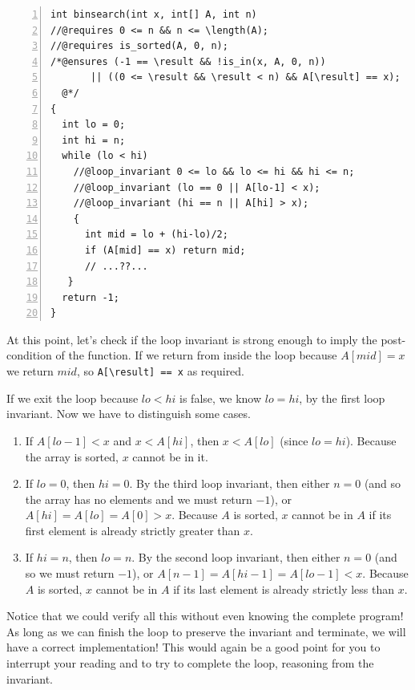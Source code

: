 \begin{lstlisting}[language={[C0]C}, numbers=left]
int binsearch(int x, int[] A, int n)
//@requires 0 <= n && n <= \length(A);
//@requires is_sorted(A, 0, n);
/*@ensures (-1 == \result && !is_in(x, A, 0, n))
       || ((0 <= \result && \result < n) && A[\result] == x);
  @*/
{
  int lo = 0;
  int hi = n;
  while (lo < hi)
    //@loop_invariant 0 <= lo && lo <= hi && hi <= n;
    //@loop_invariant (lo == 0 || A[lo-1] < x);
    //@loop_invariant (hi == n || A[hi] > x);
    {
      int mid = lo + (hi-lo)/2;
      if (A[mid] == x) return mid;
      // ...??...
   }
  return -1;
}
\end{lstlisting}

At this point, let's check if the loop invariant is strong enough
to imply the post-condition of the function.  If we return from inside
the loop because $A[\mathit{mid}] = x$ we return $\mathit{mid}$,
so \lstinline'A[\result] == x' as required.

If we exit the loop because $\mathit{lo} < \mathit{hi}$ is
false, we know $\mathit{lo} = \mathit{hi}$, by the first
loop invariant.  Now we have to distinguish some cases.
\begin{enumerate}
\item If $A[\mathit{lo}-1] < x$ and $x < A[\mathit{hi}]$, then
  $x < A[\mathit{lo}]$ (since $\mathit{lo} = \mathit{hi}$).
  Because the array is sorted, $x$ cannot be in it.
\item If $\mathit{lo} = 0$, then $\mathit{hi} = 0$.
  By the third loop invariant, then either $n = 0$ (and so the array has
  no elements and we must return $-1$), or $A[\mathit{hi}] =
  A[\mathit{lo}] = A[0] > x$.  Because $A$ is sorted, $x$ cannot
  be in $A$ if its first element is already strictly greater than $x$.
\item If $\mathit{hi} = n$, then $\mathit{lo} = n$.
  By the second loop invariant, then either $n = 0$ (and so we must return
  $-1$), or $A[n-1] = A[\mathit{hi}-1] = A[\mathit{lo}-1] < x$.
  Because $A$ is sorted, $x$ cannot be in $A$ if its last element
  is already strictly less than $x$.
\end{enumerate}

Notice that we could verify all this without even knowing the complete
program!  As long as we can finish the loop to preserve the invariant
and terminate, we will have a correct implementation!  This would
again be a good point for you to interrupt your reading and to try to
complete the loop, reasoning from the invariant.

